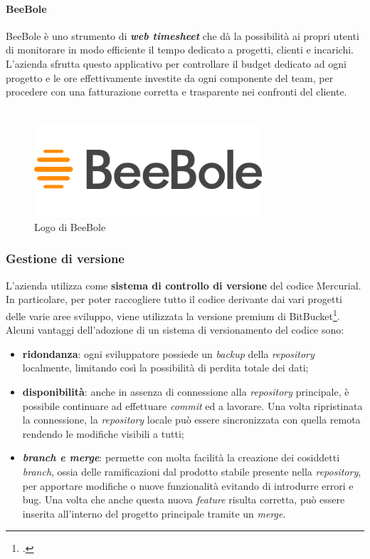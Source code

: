 \paragraph{BeeBole}
BeeBole è uno strumento di \textbf{\emph{web timesheet}} che dà la possibilità ai propri utenti di monitorare in modo efficiente il tempo dedicato a progetti, clienti e incarichi. \\
L'azienda \azienda{} sfrutta questo applicativo per controllare il budget dedicato ad ogni progetto e le ore effettivamente investite da ogni componente del team, per procedere con una fatturazione corretta e trasparente nei confronti del cliente.
\\ \\
\begin{figure}[h]
	\centering
	\includegraphics[scale=0.5]{../Immagini/beebole.png}
	\caption{Logo di BeeBole}
\end{figure}
\subsubsection{Gestione di versione}
L'azienda \azienda{} utilizza come \textbf{sistema di controllo di versione} del codice \gls{Mercurial}. In particolare, per
poter raccogliere tutto il codice derivante dai vari progetti delle varie aree sviluppo, viene utilizzata la versione premium di BitBucket\footcite{bit}.\\

Alcuni vantaggi dell'adozione di un sistema di versionamento del codice sono:
\begin{itemize}
	\item \textbf{ridondanza}: ogni sviluppatore possiede un \emph{backup} della \emph{repository} localmente, limitando così la possibilità di perdita totale dei dati;
	\item \textbf{disponibilità}: anche in assenza di connessione alla \emph{repository} principale, è possibile continuare ad effettuare \emph{commit} ed a lavorare. Una volta ripristinata
la connessione, la \emph{repository} locale può essere sincronizzata con quella remota
rendendo le modifiche visibili a tutti;
	\item \textbf{\emph{branch e merge}}: permette con molta facilità la creazione dei cosiddetti \emph{branch}, ossia delle ramificazioni dal prodotto stabile presente nella \emph{repository}, per apportare modifiche o nuove funzionalità evitando di introdurre errori e bug. Una volta che anche questa nuova \emph{feature} risulta corretta, può essere inserita all'interno del progetto principale tramite un \emph{merge}.
\end{itemize}
